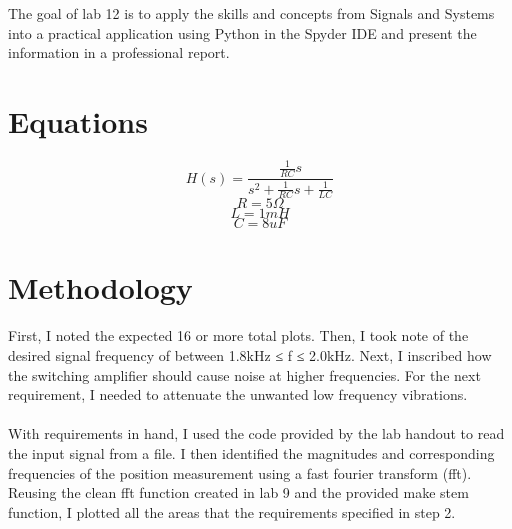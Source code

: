 \documentclass[12pt]{report}
\begin{document}
The goal of lab 12 is to apply the skills and concepts from Signals and Systems into a practical application using Python in the Spyder IDE and present the information in a professional report.

\section{Equations}
    \begin{equation*}
        H(s) = \frac{\frac{1}{RC}s}{s^2+\frac{1}{RC}s+\frac{1}{LC}} 
    \end{equation*}
    \begin{equation*}
        R = 5\Omega
    \end{equation*}
    \begin{equation*}
        L = 1mH
    \end{equation*}
    \begin{equation*}
        C = 8uF
    \end{equation*}
    
\section{Methodology}


    \paragraph{} First, I noted the expected 16 or more total plots. Then, I took note of the desired signal frequency of between 1.8kHz ≤ f ≤ 2.0kHz. Next, I inscribed how the switching amplifier should cause noise at higher frequencies. For the next requirement, I needed to attenuate the unwanted low frequency vibrations. 
    
    \paragraph{} With requirements in hand, I used the code provided by the lab handout to read the input signal from a file. I then identified the magnitudes and corresponding frequencies of the position measurement using a fast fourier transform (fft). Reusing the clean fft function created in lab 9 and the provided make stem function, I plotted all the areas that the requirements specified in step 2. 
    
\end{document}

